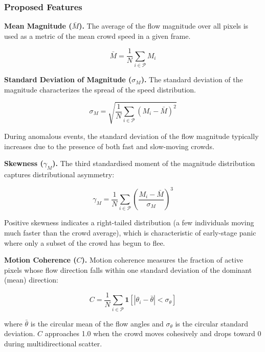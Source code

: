 \subsubsection{Proposed Features}

\textbf{Mean Magnitude ($\bar{M}$).} The average of the flow magnitude over all pixels is used as a metric of the mean crowd speed in a given frame.

\begin{equation}
  \bar{M} = \frac{1}{N} \sum_{i \in \mathcal{P}} M_i
  \label{eq:mean_mag}
\end{equation}

\textbf{Standard Deviation of Magnitude ($\sigma_M$).} The standard deviation of the magnitude characterizes the spread of the speed distribution.

\begin{equation}
  \sigma_M = \sqrt{\frac{1}{N} \sum_{i \in \mathcal{P}} (M_i - \bar{M})^2}
  \label{eq:std_mag}
\end{equation}

During anomalous events, the standard deviation of the flow magnitude typically increases due to the presence of both fast and slow-moving crowds.

\textbf{Skewness ($\gamma_M$).} The third standardised moment of the magnitude distribution captures distributional asymmetry:

\begin{equation}
  \gamma_M = \frac{1}{N} \sum_{i \in \mathcal{P}} \left(\frac{M_i - \bar{M}}{\sigma_M}\right)^3
  \label{eq:skewness}
\end{equation}

Positive skewness indicates a right-tailed distribution (a few individuals moving much faster than the crowd average), which is characteristic of early-stage panic where only a subset of the crowd has begun to flee.

\textbf{Motion Coherence ($C$).} Motion coherence measures the fraction of active pixels whose flow direction falls within one standard deviation of the dominant (mean) direction:

\begin{equation}
  C = \frac{1}{N} \sum_{i \in \mathcal{P}} \mathbf{1}\!\left[|\theta_i - \bar{\theta}| < \sigma_\theta\right]
  \label{eq:coherence}
\end{equation}

\noindent where $\bar{\theta}$ is the circular mean of the flow angles and $\sigma_\theta$ is the circular standard deviation. $C$ approaches 1.0 when the crowd moves cohesively and drops toward 0 during multidirectional scatter.

